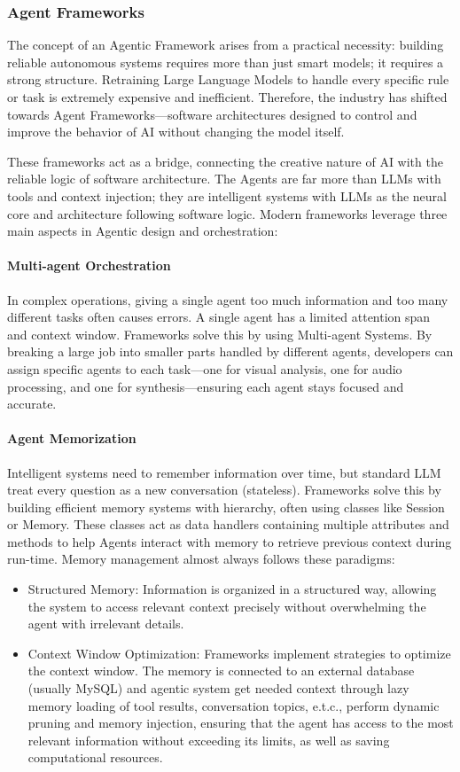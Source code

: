 \subsubsection*{Agent Frameworks}
The concept of an Agentic Framework arises from a practical necessity: building reliable autonomous systems requires more than just smart models; it requires a strong structure. Retraining Large Language Models to handle every specific rule or task is extremely expensive and inefficient. Therefore, the industry has shifted towards Agent Frameworks—software architectures designed to control and improve the behavior of AI without changing the model itself.

These frameworks act as a bridge, connecting the creative nature of AI with the reliable logic of software architecture. The Agents are far more than LLMs with tools and context injection; they are intelligent systems with LLMs as the neural core and architecture following software logic. Modern frameworks leverage three main aspects in Agentic design and orchestration:

\paragraph*{{Multi-agent Orchestration}} 
In complex operations, giving a single agent too much information and too many different tasks often causes errors. A single agent has a limited attention span and context window. Frameworks solve this by using Multi-agent Systems. By breaking a large job into smaller parts handled by different agents, developers can assign specific agents to each task—one for visual analysis, one for audio processing, and one for synthesis—ensuring each agent stays focused and accurate.

\paragraph*{{Agent Memorization}}
Intelligent systems need to remember information over time, but standard LLM treat every question as a new conversation (stateless). Frameworks solve this by building efficient memory systems with hierarchy, often using classes like Session or Memory. These classes act as data handlers containing multiple attributes and methods to help Agents interact with memory to retrieve previous context during run-time. Memory management almost always follows these paradigms:
\begin{itemize}
    \item {Structured Memory:} Information is organized in a structured way, allowing the system to access relevant context precisely without overwhelming the agent with irrelevant details.
    \item {Context Window Optimization:} Frameworks implement strategies to optimize the context window. The memory is connected to an external database (usually MySQL) and agentic system get needed context through lazy memory loading of tool results, conversation topics, e.t.c., perform dynamic pruning and memory injection, ensuring that the agent has access to the most relevant information without exceeding its limits, as well as saving computational resources.
\end{itemize}

